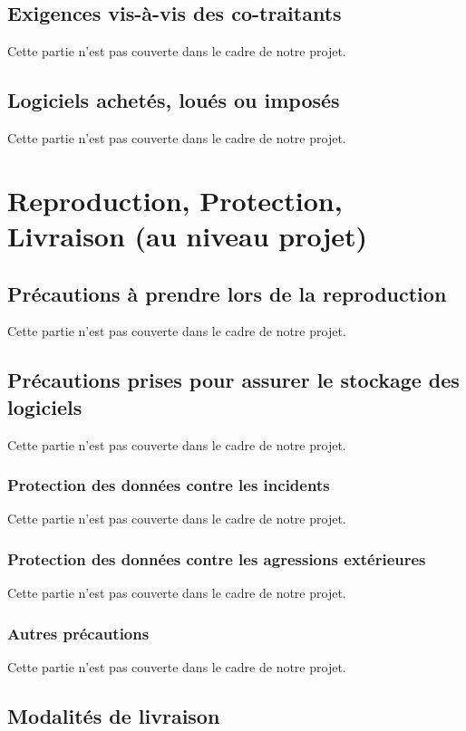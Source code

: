 \documentclass[a4paper]{article}
\begin{document}
\subsection{Exigences vis-à-vis des co-traitants}
Cette partie n'est pas couverte dans le cadre de notre projet.

\subsection{Logiciels achetés, loués ou imposés}
Cette partie n'est pas couverte dans le cadre de notre projet.

\section{Reproduction, Protection, Livraison (au niveau projet)}

\subsection{Précautions à prendre lors de la reproduction}
Cette partie n'est pas couverte dans le cadre de notre projet.

\subsection{Précautions prises pour assurer le stockage des logiciels}
Cette partie n'est pas couverte dans le cadre de notre projet.

\subsubsection{Protection des données contre les incidents}
Cette partie n'est pas couverte dans le cadre de notre projet.

\subsubsection{Protection des données contre les agressions extérieures}
Cette partie n'est pas couverte dans le cadre de notre projet.

\subsubsection{Autres précautions}
Cette partie n'est pas couverte dans le cadre de notre projet.

\subsection{Modalités de livraison}
\end{document}
